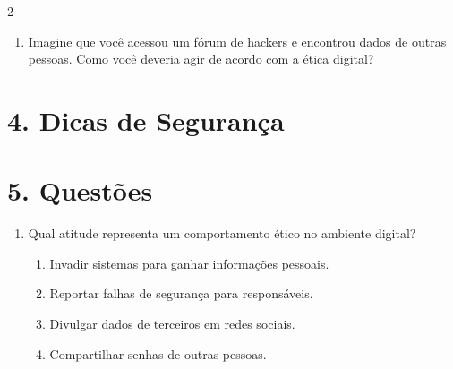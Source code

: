 \documentclass[11pt]{article}
\begin{document}
\begin{multicols}{2}
\begin{enumerate}[leftmargin=*]
\item Imagine que você acessou um fórum de hackers e encontrou dados de outras pessoas. Como você deveria agir de acordo com a ética digital?\\[4\baselineskip]
\end{enumerate}

\vspace{5mm}

\section*{4. Dicas de Segurança}

\begin{center}
\end{center}

\section*{5. Questões}

\begin{enumerate}[leftmargin=*]

\item Qual atitude representa um comportamento ético no ambiente digital?
\begin{enumerate}[label=\alph*)]
\item Invadir sistemas para ganhar informações pessoais.
\item Reportar falhas de segurança para responsáveis.
\item Divulgar dados de terceiros em redes sociais.
\item Compartilhar senhas de outras pessoas.
\end{enumerate}


\end{enumerate}
\end{multicols}
\end{document}
